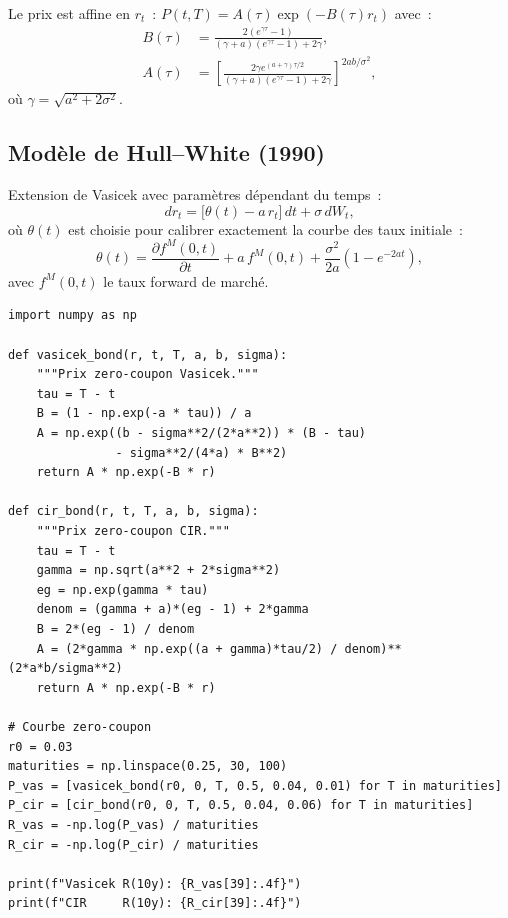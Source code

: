\begin{theoreme}
Le prix est affine en $r_t$~:
$P(t,T) = A(\tau)\exp(-B(\tau)r_t)$ avec~:
\begin{align}
    B(\tau) &= \frac{2(e^{\gamma\tau} - 1)}
    {(\gamma + a)(e^{\gamma\tau} - 1) + 2\gamma}, \\
    A(\tau) &= \left[\frac{2\gamma e^{(a+\gamma)\tau/2}}
    {(\gamma+a)(e^{\gamma\tau}-1) + 2\gamma}\right]^{2ab/\sigma^2},
\end{align}
o\`u $\gamma = \sqrt{a^2 + 2\sigma^2}$.
\end{theoreme}

\subsection{Mod\`ele de Hull--White (1990)}

\begin{definition}
Extension de Vasicek avec param\`etres d\'ependant du temps~:
\[
    dr_t = \bigl[\theta(t) - a\,r_t\bigr]\,dt + \sigma\,dW_t,
\]
o\`u $\theta(t)$ est choisie pour calibrer exactement la courbe des taux
initiale~:
\[
    \theta(t) = \frac{\partial f^M(0,t)}{\partial t} + a\,f^M(0,t)
    + \frac{\sigma^2}{2a}(1 - e^{-2at}),
\]
avec $f^M(0,t)$ le taux forward de march\'e.
\end{definition}

\begin{codeblock}[title=\textbf{Mod\`eles de Vasicek et CIR}]
\begin{verbatim}
import numpy as np

def vasicek_bond(r, t, T, a, b, sigma):
    """Prix zero-coupon Vasicek."""
    tau = T - t
    B = (1 - np.exp(-a * tau)) / a
    A = np.exp((b - sigma**2/(2*a**2)) * (B - tau)
               - sigma**2/(4*a) * B**2)
    return A * np.exp(-B * r)

def cir_bond(r, t, T, a, b, sigma):
    """Prix zero-coupon CIR."""
    tau = T - t
    gamma = np.sqrt(a**2 + 2*sigma**2)
    eg = np.exp(gamma * tau)
    denom = (gamma + a)*(eg - 1) + 2*gamma
    B = 2*(eg - 1) / denom
    A = (2*gamma * np.exp((a + gamma)*tau/2) / denom)**(2*a*b/sigma**2)
    return A * np.exp(-B * r)

# Courbe zero-coupon
r0 = 0.03
maturities = np.linspace(0.25, 30, 100)
P_vas = [vasicek_bond(r0, 0, T, 0.5, 0.04, 0.01) for T in maturities]
P_cir = [cir_bond(r0, 0, T, 0.5, 0.04, 0.06) for T in maturities]
R_vas = -np.log(P_vas) / maturities
R_cir = -np.log(P_cir) / maturities

print(f"Vasicek R(10y): {R_vas[39]:.4f}")
print(f"CIR     R(10y): {R_cir[39]:.4f}")
\end{verbatim}
\end{codeblock}

